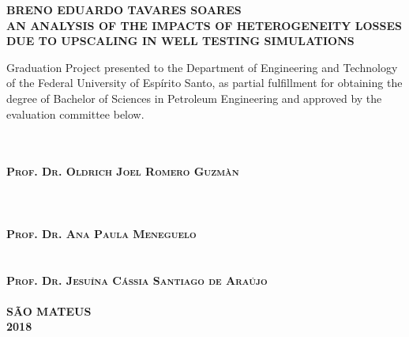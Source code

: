 \begin{titlepage}
	\center
	
	\textsc{\textbf{BRENO EDUARDO TAVARES SOARES}}\\[72pt]
	
	\textsc{\textbf{AN ANALYSIS OF THE IMPACTS OF HETEROGENEITY LOSSES DUE TO UPSCALING IN WELL TESTING SIMULATIONS}}\\[48pt]
	
	\hfill\begin{minipage}{0.5\linewidth}
		Graduation Project presented to the Department of Engineering and Technology of the Federal University of Esp\'irito Santo, as partial fulfillment for obtaining the degree of Bachelor of Sciences in Petroleum Engineering and approved by the evaluation committee below.
	\end{minipage}\\[48pt]
	
	\makebox[4.5in]{\hrulefill}\\
	\textsc{\textbf{Prof. Dr. Oldrich Joel Romero Guzm\`an}}\\
	\\
	\\[12pt]
	
	\makebox[4.5in]{\hrulefill}\\
	\textsc{\textbf{Prof. Dr. Ana Paula Meneguelo}}\\
	\\[12pt]
	
	\makebox[4.5in]{\hrulefill}\\
	\textsc{\textbf{Prof. Dr. Jesu\'ina C\'assia Santiago de Ara\'ujo}}\\
	\\[36pt]
	
	\textsc{\textbf{S\~AO MATEUS}}\\
	\textsc{\textbf{2018}}\\
\end{titlepage}
